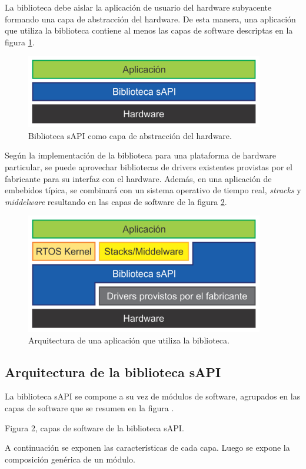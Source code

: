 La biblioteca debe aislar la aplicación de usuario del hardware subyacente formando una capa de abstracción del hardware. De esta manera, una aplicación que utiliza la biblioteca contiene al menos las capas de software descriptas en la figura \ref{fig:sapiCapas1}.

\begin{figure}[!htbp]
\begin{center}  %
\includegraphics*[width=10.4cm]{Figures/sapiCapas1.png}
\par\caption{Biblioteca sAPI como capa de abstracción del hardware.}\label{fig:sapiCapas1}
\end{center}
\end{figure}

Según la implementación de la biblioteca para una plataforma de hardware particular, se puede aprovechar bibliotecas de drivers existentes provistas por el fabricante para su interfaz con el hardware. Además, en una aplicación de embebidos típica, se combinará con un sistema operativo de tiempo real, \emph{stracks} y \emph{middelware} resultando en las capas de software de la figura \ref{fig:sapiCapas2}.

\begin{figure}[!htbp]
\begin{center}  %
\includegraphics*[width=10.4cm]{Figures/sapiCapas2.png}
\par\caption{Arquitectura de una aplicación que utiliza la biblioteca.}\label{fig:sapiCapas2}
\end{center}
\end{figure}

\subsection{Arquitectura de la biblioteca sAPI}

La biblioteca sAPI se compone a su vez de módulos de software, agrupados en las capas de software que se resumen en la figura .


Figura 2, capas de software de la biblioteca sAPI.

A continuación se exponen las características de cada capa. Luego se expone la composición genérica de un módulo.

